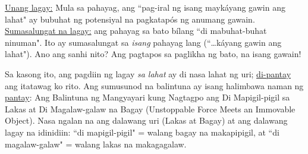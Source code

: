 \documentclass{article}
\begin{document}
\noindent\underline{Unang lagay:} Mula sa pahayag, ang ``pag-iral ng isang maykáyang gawin ang lahat" ay bubuhat ng potensiyal na pagkatapós ng anumang gawain.\\
\underline{Sumasalungat na lagay:} ang pahayag sa bato bílang ``di mabuhat-buhat ninuman". Ito ay sumasalungat sa \textit{isang} pahayag lang (``\ldots káyang gawin ang lahat"). Ano ang sanhi nito? Ang pagtapos sa paglikha ng bato, na isang gawain!

Sa kasong ito, ang pagdiin ng lagay \textit{sa lahat} ay di nasa lahat ng uri; \underline{di-pantay} ang itatawag ko rito. Ang sumusunod na balintuna ay isang halimbawa naman ng \underline{pantay}: Ang Balintuna ng Mangyayari kung Nagtagpo ang Di Mapigil-pigil sa Lakas at Di Magalaw-galaw na Bagay (Unstoppable Force Meets an Immovable Object). Nasa ngalan na ang dalawang uri (Lakas at Bagay) at ang dalawang lagay na idinidiin: ``di mapigil-pigil" = walang bagay na makapipigil, at ``di magalaw-galaw" = walang lakas na makagagalaw.
\end{document}

